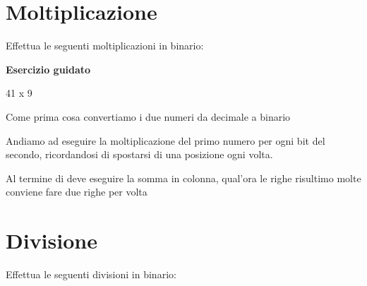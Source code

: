 \documentclass[11pt,fleqn]{book}
\begin{document}
\newpage


\newpage

\section{Moltiplicazione}

Effettua le seguenti moltiplicazioni in binario:

\begin{esercizio}[1]
    \textbf{Esercizio guidato}

    41 x 9

    Come prima cosa convertiamo i due numeri da decimale a binario

    \immediate{}
    

    \immediate{}
    

    Andiamo ad eseguire la moltiplicazione del primo numero per ogni bit del secondo, ricordandosi di spostarsi di una posizione ogni volta.

    Al termine di deve eseguire la somma in colonna, qual'ora le righe risultimo molte conviene fare due righe per volta

    \immediate{}
    

\end{esercizio}

\newpage


\newpage

\section{Divisione}

Effettua le seguenti divisioni in binario:
\end{document}
